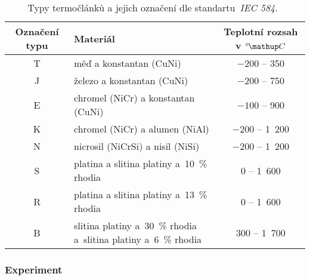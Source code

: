\begin{table}[htbp]
    \centering
    \begin{tabular}{cm{7cm}c}
        \toprule
        Označení typu & Materiál & Teplotní rozsah v $\C$\\
        \midrule
        T & měď a konstantan (CuNi) & $-200$ -- 350\phantom{1 }\\
        J & železo a konstantan (CuNi)& $-200$ -- 750\phantom{1 }\\
        E & chromel (NiCr) a konstantan (CuNi) & $-100$ -- 900\phantom{1 }\\
        K & chromel (NiCr) a alumen (NiAl) & $-200$ -- 1~200\\
        N & nicrosil (NiCrSi) a nisil (NiSi) & $-200$ -- 1~200\\
        S & platina a slitina platiny a~10~\% rhodia & \phantom{$-00$}0 -- 1~600\\
        R & platina a slitina platiny a~13~\% rhodia & \phantom{$-00$}0 -- 1~600\\
        B & slitina platiny a~30~\% rhodia a~slitina platiny 
        a~6~\% rhodia & \phantom{$-$}300 -- 1~700\\
        \bottomrule
    \end{tabular}
    \caption{Typy termočlánků a jejich označení dle 
    standartu~\emph{IEC 584}.~\cite{diplomka,iec584}}
    \label{tab:iec584}
\end{table}

\subsubsection{Experiment}
